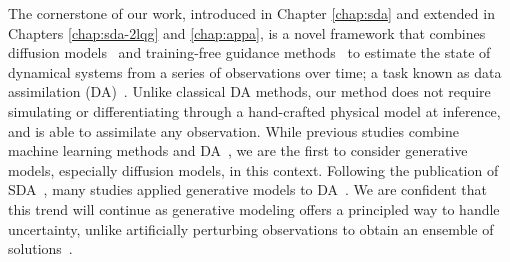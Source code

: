 The cornerstone of our work, introduced in Chapter \ref{chap:sda} and extended in Chapters \ref{chap:sda-2lqg} and \ref{chap:appa}, is a novel framework that combines diffusion models~\cite{sohl-dickstein2015deep, ho2020denoising} and training-free guidance methods~\cite{chung2023diffusion, song2023pseudoinverseguided, boys2023tweedie} to estimate the state of dynamical systems from a series of observations over time; a task known as data assimilation (DA)~\cite{ledimet1986variational, tremolet2006accounting, hamill2006ensemblebased, evensen2009data, carrassi2018data}. Unlike classical DA methods, our method does not require simulating or differentiating through a hand-crafted physical model at inference, and is able to assimilate any observation. While previous studies combine machine learning methods and DA~\cite{mack2020attentionbased, brajard2020combining, brajard2021combining, arcucci2021deep, fablet2021learning, frerix2021variational, yeung2022physicsinformed, andrychowicz2023deep, cheng2023machine}, we are the first to consider generative models, especially diffusion models, in this context. Following the publication of SDA~\cite{rozet2023scorebased}, many studies applied generative models to DA~\cite{huang2024diffda, foroumandi2025harnessing, martin2025generative, manshausen2025generative, schmidt2025generative, shen2025conditional, sun2025alignda, chakraborty2025multimodal, xu2025fuxida}. We are confident that this trend will continue as generative modeling offers a principled way to handle uncertainty, unlike artificially perturbing observations to obtain an ensemble of solutions~\cite{liu2013ensemblebased, hoteit2015mitigating, auligne2016ensemble, bannister2017review}.

